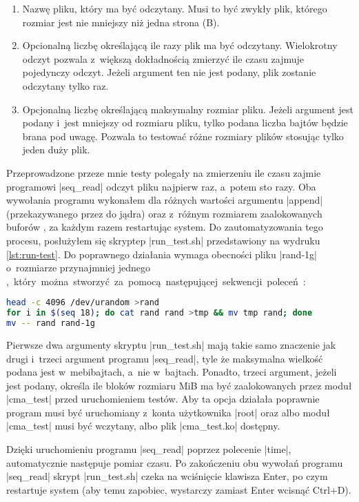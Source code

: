\begin{enumerate}
\item Nazwę pliku, który ma być odczytany.  Musi to być zwykły plik,
  którego rozmiar jest nie mniejszy niż jedna strona (\unit[4096]{B}).
\item Opcionalną liczbę określającą ile razy plik ma być odczytany.
  Wielokrotny odczyt pozwala z~większą dokładnością zmierzyć ile czasu
  zajmuje pojedynczy odczyt.  Jeżeli argument ten nie jest podany,
  plik zostanie odczytany tylko raz.
\item Opcjonalną liczbę określającą maksymalny rozmiar pliku.  Jeżeli
  argument jest podany i~jest mniejszy od rozmiaru pliku, tylko podana
  liczba bajtów będzie brana pod uwagę.  Pozwala to testować różne
  rozmiary plików stosując tylko jeden duży plik.
\end{enumerate}

Przeprowadzone przeze mnie testy polegały na zmierzeniu ile czasu
zajmie programowi \code|seq_read| odczyt pliku najpierw raz, a~potem
sto razy.  Oba wywołania programu wykonałem dla różnych wartości
argumentu \code|append| (przekazywanego przez  do jądra)
oraz z~różnym rozmiarem zaalokowanych buforów , za każdym
razem restartując system.  Do zautomatyzowania tego procesu,
posłużyłem się skryptep \code|run_test.sh| przedstawiony na wydruku
\ref{lst:run-test}.  Do poprawnego działania wymaga obecności pliku
\code|rand-1g| o~rozmiarze przynajmniej jednego \unit[GiB], który
można stworzyć za pomocą następującej sekwencji poleceń:

\begin{lstlisting}[language=sh,numbers=none,columns=fullflexible]
head -c 4096 /dev/urandom >rand
for i in $(seq 18); do cat rand rand >tmp && mv tmp rand; done
mv -- rand rand-1g
\end{lstlisting}

Pierwsze dwa argumenty skryptu \code|run_test.sh| mają takie samo
znaczenie jak drugi i~trzeci argument programu \code|seq_read|, tyle
że maksymalna wielkość podana jest w~mebibajtach, a~nie w~bajtach.
Ponadto, trzeci argument, jeżeli jest podany, określa ile bloków
rozmiaru \unit[128]{MiB} ma być zaalokowanych przez moduł
\code|cma_test| przed uruchomieniem testów.  Aby ta opcja działała
poprawnie program musi być uruchomiany z~konta użytkownika \code|root|
oraz albo moduł \code|cma_test| musi być wczytany, albo plik
\code|cma_test.ko| dostępny.

Dzięki uruchomieniu programu \code|seq_read| poprzez polecenie
\code|time|, automatycznie następuje pomiar czasu.  Po zakończeniu obu
wywołań programu \code|seq_read| skrypt \code|run_test.sh| czeka na
wciśnięcie klawisza Enter, po czym restartuje system (aby temu
zapobiec, wystarczy zamiast Enter wcisnąć Ctrl+D).

